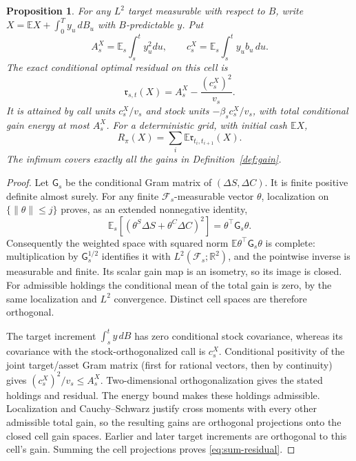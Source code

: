\documentclass[11pt,a4paper]{amsart}
\theoremstyle{plain}
\newtheorem{proposition}[theorem]{Proposition}
\theoremstyle{definition}
\theoremstyle{remark}
\newcommand{\R}{\mathbb{R}}
\newcommand{\EE}{\mathbb{E}}
\newcommand{\F}{\mathcal F}
\newcommand{\Es}{\EE_s}
\begin{document}
\begin{proposition}\label{prop:projection}
For any $L^2$ target measurable with respect to $B$, write
$X=\EE X+\int_0^T y_u\,dB_u$ with $B$-predictable $y$. Put
\[
 A_s^X=\Es\int_s^t y_u^2du,\qquad c_s^X=\Es\int_s^t y_ub_u\,du.
\]
The exact conditional optimal residual on this cell is
\begin{equation}\label{eq:true-residual}
 \mathfrak r_{s,t}(X)=A_s^X-\frac{(c_s^X)^2}{v_s}.
\end{equation}
It is attained by call units $c_s^X/v_s$ and stock units $-\beta_s c_s^X/v_s$, with total conditional gain energy at most $A_s^X$. For a deterministic grid, with initial cash $\EE X$,
\begin{equation}\label{eq:sum-residual}
 R_\pi(X)=\sum_i\EE\mathfrak r_{t_i,t_{i+1}}(X).
\end{equation}
The infimum covers exactly all the gains in Definition~\ref{def:gain}.
\end{proposition}
\begin{proof}
Let $\mathsf G_s$ be the conditional Gram matrix of $(\Delta S,\Delta C)$. It is finite positive definite almost surely. For any finite $\F_s$-measurable vector $\theta$, localization on $\{\|\theta\|\le j\}$ proves, as an extended nonnegative identity,
\[
 \Es[(\theta^S\Delta S+\theta^C\Delta C)^2]
       =\theta^\top\mathsf G_s\theta.
\]
Consequently the weighted space with squared norm $\EE\theta^\top\mathsf G_s\theta$ is complete: multiplication by $\mathsf G_s^{1/2}$ identifies it with $L^2(\F_s;\R^2)$, and the pointwise inverse is measurable and finite. Its scalar gain map is an isometry, so its image is closed. For admissible holdings the conditional mean of the total gain is zero, by the same localization and $L^2$ convergence. Distinct cell spaces are therefore orthogonal.

The target increment $\int_s^t y\,dB$ has zero conditional stock covariance, whereas its covariance with the stock-orthogonalized call is $c_s^X$. Conditional positivity of the joint target/asset Gram matrix (first for rational vectors, then by continuity) gives $(c_s^X)^2/v_s\le A_s^X$. Two-dimensional orthogonalization gives the stated holdings and residual. The energy bound makes these holdings admissible. Localization and Cauchy--Schwarz justify cross moments with every other admissible total gain, so the resulting gains are orthogonal projections onto the closed cell gain spaces. Earlier and later target increments are orthogonal to this cell's gain. Summing the cell projections proves \eqref{eq:sum-residual}.
\end{proof}
\end{document}
